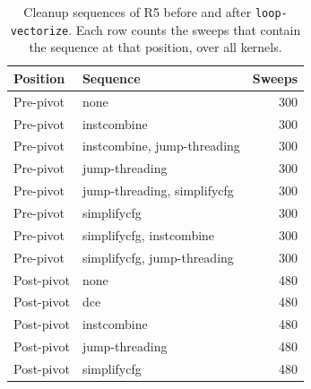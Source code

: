 \begin{table}[t]
\centering
\caption{Cleanup sequences of R5 before and after \texttt{loop-vectorize}. Each row counts the sweeps that contain the sequence at that position, over all kernels.}
\label{tab:r5seq}
\setlength{\tabcolsep}{3pt}
\begin{tabular}{|l|l|r|}
\hline
Position & Sequence & Sweeps \\
\hline
Pre-pivot & none & 300 \\
\hline
Pre-pivot & instcombine & 300 \\
\hline
Pre-pivot & instcombine, jump-threading & 300 \\
\hline
Pre-pivot & jump-threading & 300 \\
\hline
Pre-pivot & jump-threading, simplifycfg & 300 \\
\hline
Pre-pivot & simplifycfg & 300 \\
\hline
Pre-pivot & simplifycfg, instcombine & 300 \\
\hline
Pre-pivot & simplifycfg, jump-threading & 300 \\
\hline
Post-pivot & none & 480 \\
\hline
Post-pivot & dce & 480 \\
\hline
Post-pivot & instcombine & 480 \\
\hline
Post-pivot & jump-threading & 480 \\
\hline
Post-pivot & simplifycfg & 480 \\
\hline
\end{tabular}
\end{table}
